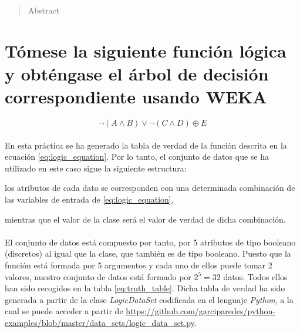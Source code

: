 \documentclass[10pt, a4paper,spanish]{article}
\begin{document}
	\maketitle %

	\thispagestyle{fancy} %



	\begin{abstract}
		\noindent Abstract
	\end{abstract}



  \section{Tómese la siguiente función lógica y obténgase el árbol de decisión correspondiente usando WEKA}

		\begin{equation}
			\label{eq:logic_equation}
			\neg(A \land B) \lor \neg(C \land D) \oplus E
		\end{equation}

		\paragraph{}
		En esta práctica se ha generado la tabla de verdad de la función descrita en la ecuación \eqref{eq:logic_equation}. Por lo tanto, el conjunto de datos que se ha utilizado en este caso sigue la siguiente estructura:
		\begin{enumerate*} [label=\itshape\alph*\upshape)]
			\item los atributos de cada dato se corresponden con una determinada combinación de las variables de entrada de \eqref{eq:logic_equation},
			\item mientras que el valor de la clase será el valor de verdad de dicha combinación.
		\end{enumerate*}

		\paragraph{}
		El conjunto de datos está compuesto por tanto, por 5 atributos de tipo booleano (discretos) al igual que la clase, que también es de tipo booleano. Puesto que la función está formada por 5 argumentos y cada uno de ellos puede tomar 2 valores, nuestro conjunto de datos está formado por $2 ^ 5 = 32$ datos. Todos ellos han sido recogidos en la tabla \ref{eq:truth_table}. Dicha tabla de verdad ha sido generada a partir de la clase \emph{LogicDataSet} codificada en el lenguaje \emph{Python}, a la cual se puede acceder a partir de \url{https://github.com/garciparedes/python-examples/blob/master/data_sets/logic_data_set.py}\cite{github:garciparedes-python-examples}.
\end{document}
